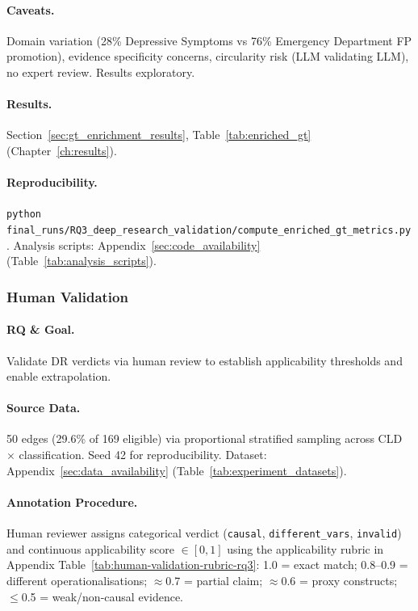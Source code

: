 \paragraph{Caveats.}
Domain variation (28\% Depressive Symptoms vs 76\% Emergency Department FP promotion), evidence specificity concerns, circularity risk (LLM validating LLM), no expert review. Results exploratory.

\paragraph{Results.}
Section~\ref{sec:gt_enrichment_results}, Table~\ref{tab:enriched_gt} (Chapter~\ref{ch:results}).

\paragraph{Reproducibility.}
\texttt{python final\_runs/RQ3\_deep\_research\_validation/compute\_enriched\_gt\_metrics.py}. Analysis scripts: Appendix~\ref{sec:code_availability} (Table~\ref{tab:analysis_scripts}).

\subsubsection{Human Validation}
\label{sec:rq3_human_validation}

\paragraph{RQ \& Goal.}
Validate DR verdicts via human review to establish applicability thresholds and enable extrapolation.

\paragraph{Source Data.}
50 edges (29.6\% of 169 eligible) via proportional stratified sampling across CLD $\times$ classification. Seed 42 for reproducibility. Dataset: Appendix~\ref{sec:data_availability} (Table~\ref{tab:experiment_datasets}).

\paragraph{Annotation Procedure.}
Human reviewer assigns categorical verdict (\texttt{causal}, \texttt{different\_vars}, \texttt{invalid}) and continuous applicability score $\in[0,1]$ using the applicability rubric in Appendix Table~\ref{tab:human-validation-rubric-rq3}: 1.0 = exact match; 0.8--0.9 = different operationalisations; $\approx$0.7 = partial claim; $\approx$0.6 = proxy constructs; $\leq$0.5 = weak/non-causal evidence.

